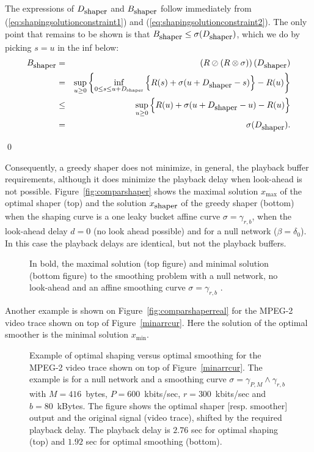 \pr The expressions of $D_{\mbox{\small shaper}}$ and $B_{\mbox{\small shaper}}$ follow immediately from (\ref{eq:shapingsolutionconstraint1}) and (\ref{eq:shapingsolutionconstraint2}). The only point that remains to be shown is that $B_{\mbox{\small shaper}} \leq
\sigma(D_{\mbox{\small shaper}})$, which we do by picking $s = u$ in the inf below:
\begin{eqnarray*}
 B_{\mbox{\small shaper}}  & = & \left( R \oslash (R \otimes \sigma) \right)  (D_{\mbox{\small shaper}}) \\
 & = & \sup_{u \geq 0} \left\{ \inf_{0 \leq s \leq u + D_{\mbox{\tiny shaper}}} \left\{ R(s) + \sigma(u  + D_{\mbox{\small shaper}} - s) \right\} - R(u) \right\} \\
 & \leq & \sup_{u \geq 0} \left\{ R(u) + \sigma(u  + D_{\mbox{\small shaper}} - u) - R(u) \right\} \\
 & = &  \sigma(D_{\mbox{\small shaper}}).
\end{eqnarray*}

\qed

Consequently, a greedy shaper does not minimize, in general, the playback buffer requirements,
although it does minimize the playback delay when look-ahead is not possible.
Figure~\ref{fig:comparshaper} shows the maximal solution $x_{\max}$ of the optimal shaper (top) and the solution $x_{\mbox{\small shaper}}$ of the greedy shaper (bottom) when the shaping curve is a one leaky bucket affine curve $\sigma = \gamma_{r,b}$, when the look-ahead delay $d=0$ (no look ahead possible) and for a null network ($\beta = \delta_0$). In this case the playback delays are identical, but not the playback buffers.

\begin{figure}[h!]
\caption{In bold, the maximal solution (top figure) and minimal solution (bottom figure)
to the smoothing problem with a null network, no look-ahead and an affine smoothing curve $\sigma = \gamma_{r,b}$ .}
\protect{}
\end{figure}

Another example is shown on Figure~\ref{fig:comparshaperreal} for the MPEG-2 video trace shown on top of Figure~\ref{minarrcur}. Here the solution of the optimal smoother is the minimal solution  $x_{\min}$.

\begin{figure}[h!]
\caption{Example of optimal shaping versus optimal smoothing for the MPEG-2 video trace shown on top of Figure~\ref{minarrcur}.
  The example is for a null network and a smoothing curve $\sigma = \gamma_{P,M} \wedge \gamma_{r,b}$
  with $M= 416$~bytes,  $P=600$~kbits/sec, $r = 300$~kbits/sec and $b=80$~kBytes.
  The figure shows the optimal shaper [resp. smoother] output and
  the original signal (video trace), shifted by the required playback delay. The
  playback delay is $2.76$ sec for optimal shaping (top) and $1.92$ sec for optimal
  smoothing (bottom).}
\protect{}
\end{figure}

